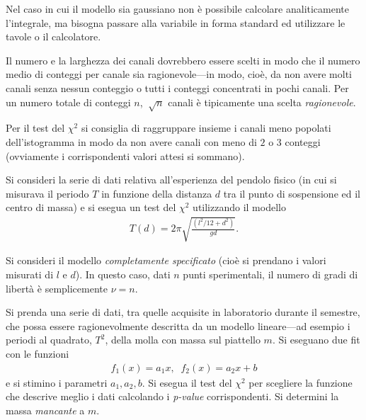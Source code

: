\documentclass{lab1-article}
\begin{document}
\begin{article}
Nel caso in cui il modello sia gaussiano non \`e possibile calcolare
analiticamente l'integrale, ma bisogna passare alla variabile in forma
standard ed utilizzare le tavole o il calcolatore.



Il numero e la larghezza dei canali dovrebbero essere scelti in modo
che il numero medio di conteggi per canale sia ragionevole---in modo, cio\`e,
da non avere molti canali senza nessun conteggio o tutti i conteggi concentrati
in pochi canali. Per un numero totale di conteggi $n$, $~\sqrt{n}$
canali \`e tipicamente una scelta \emph{ragionevole}.

Per il test del $\chi^2$ si consiglia di raggruppare insieme i canali meno
popolati dell'istogramma in modo da non avere canali con meno di $2$ o
$3$ conteggi (ovviamente i corrispondenti valori attesi si sommano).


\secmeasurements


Si consideri la serie di dati relativa all'esperienza del pendolo fisico
(in cui si misurava il periodo $T$ in funzione della distanza $d$ tra il
punto di sospensione ed il centro di massa) e si esegua un test del $\chi^2$
utilizzando il modello
\begin{align}
  T(d) = 2\pi\sqrt{\frac{(l^2/12 + d^2)}{gd}}.
\end{align}

Si consideri il modello \emph{completamente specificato} (cio\`e si
prendano i valori misurati di $l$ e $d$).
In questo caso, dati $n$ punti sperimentali, il numero di gradi di libert\`a
\`e semplicemente $\nu = n$.



Si prenda una serie di dati, tra quelle acquisite in laboratorio durante il
semestre, che possa essere ragionevolmente descritta da un modello lineare---ad
esempio i periodi al quadrato, $T^2$, della molla con massa sul piattello $m$.
Si eseguano due fit con le funzioni
\begin{align}
  f_1(x) = a_1 x,\;\;f_2(x) = a_2 x + b
\end{align}
e si stimino i parametri $a_1, a_2, b$. Si esegua il test del $\chi^2$ per
scegliere la funzione che descrive meglio i dati calcolando i \emph{p-value}
corrispondenti. Si determini la massa \emph{mancante} a $m$.



\end{article}
\end{document}
